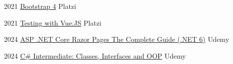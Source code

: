 \documentclass[letterpaper]{twentysecondcv} %
\begin{document}
{\begin{twenty}
        \twentyitem
        {2021}
        {\href{https://platzi.com/p/camurillo582/curso/1331-bootstrap/diploma/detalle/}
            {Bootstrap 4}
        }
        {Platzi}
        {}
        
        \twentyitem
        {2021}
        {\href{https://platzi.com/p/camurillo582/curso/1950-course/diploma/detalle/}
            {Testing with Vue.JS}
        }
        {Platzi}
        {}

        \twentyitem
        {2024}
        {\href{https://ude.my/UC-591f3b18-2bb5-405e-809f-f255c5c55927/}
            {ASP .NET Core Razor Pages The Complete Guide (.NET 6)}
        }
        {Udemy}
        {}

        \twentyitem
        {2024}
        {\href{https://ude.my/UC-f1dfcd3c-e4a3-4f3d-8ae6-9148a94ebebe/}
            {C\# Intermediate: Classes, Interfaces and OOP}
        }
        {Udemy}
        {}

         

\end{twenty}
}


 \restoregeometry
\end{document}
